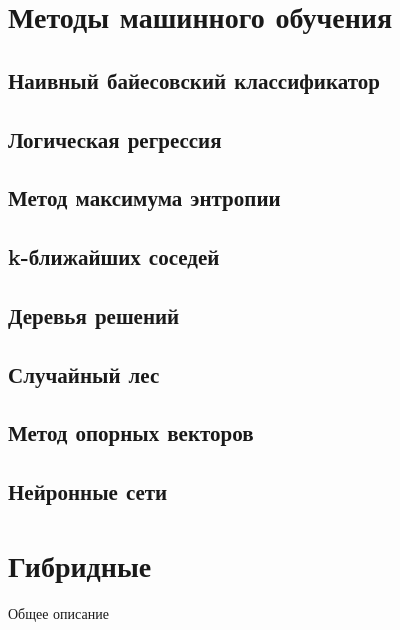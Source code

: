 \section{Методы машинного обучения}

\subsection{Наивный байесовский классификатор}

\subsection{Логическая регрессия}

\subsection{Метод максимума энтропии}

\subsection{k-ближайших соседей}

\subsection{Деревья решений}

\subsection{Случайный лес}

\subsection{Метод опорных векторов}

\subsection{Нейронные сети}

\section{Гибридные}

Общее описание
